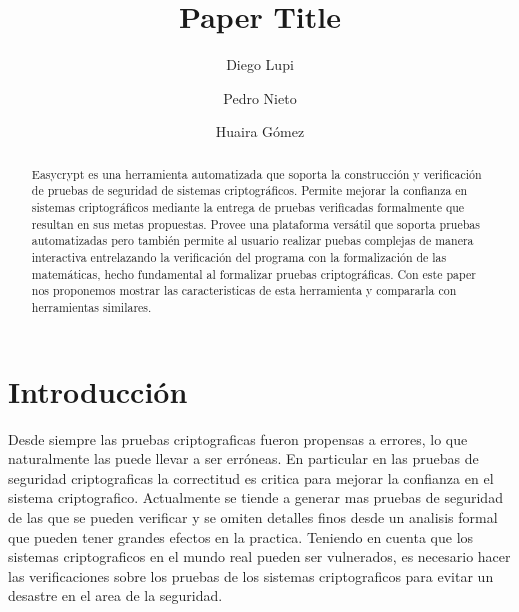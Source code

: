 \documentclass[runningheads]{llncs}
\begin{document}
\title{Paper Title}

\author{Diego Lupi\and Pedro Nieto\and Huaira Gómez}


%
%

\maketitle

\begin{abstract}
Easycrypt\cite{ref_article1} es una herramienta automatizada que soporta la construcción y verificación de pruebas de seguridad de sistemas criptográficos. Permite mejorar la confianza en sistemas criptográficos mediante la entrega de pruebas verificadas formalmente que resultan en sus metas propuestas. Provee una plataforma versátil que soporta pruebas automatizadas pero también permite al usuario realizar puebas complejas de manera interactiva entrelazando la verificación del programa con la formalización de las matemáticas, hecho fundamental al formalizar pruebas criptográficas. Con este paper nos proponemos mostrar las caracteristicas de esta herramienta y compararla con herramientas similares.

\end{abstract}
%
%
%
\section{Introducción}
Desde siempre las pruebas criptograficas fueron propensas a errores, lo que naturalmente las puede llevar a ser erróneas.
 En particular en las pruebas de seguridad criptograficas la correctitud es critica para mejorar la confianza en el sistema criptografico. Actualmente se tiende a generar mas pruebas de seguridad de las que se pueden verificar y se omiten detalles finos desde un analisis formal que pueden tener grandes efectos en la practica. Teniendo en cuenta que los sistemas criptograficos en el mundo real pueden ser vulnerados, es necesario hacer las verificaciones sobre los pruebas de los sistemas criptograficos para evitar un desastre en el area de la seguridad.
\end{document}
